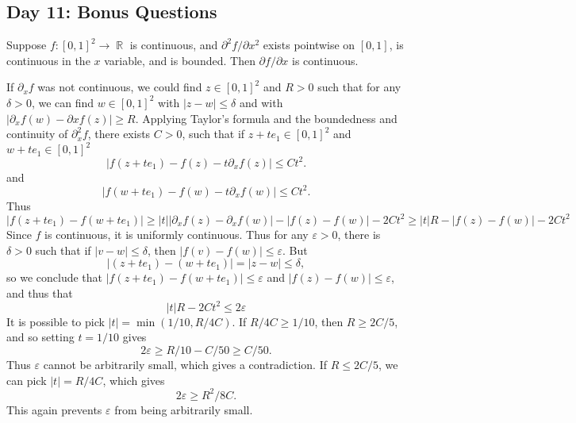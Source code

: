 \documentclass{exam}
\DeclareMathOperator{\RR}{\mathbb{R}}
\theoremstyle{problemstyle}
\newcommand{\1}[1]{\textbf{1}_{\left[#1\right]}} %
\begin{document}
\begin{questions}
\newpage
\section{Day 11: Bonus Questions}

\question Suppose $f: [0,1]^2 \to \RR$ is continuous, and $\partial^2 f / \partial x^2$ exists pointwise on $[0,1]$, is continuous in the $x$ variable, and is bounded. Then $\partial f / \partial x$ is continuous.
\begin{solution}
	If $\partial_x f$ was not continuous, we could find $z \in [0,1]^2$ and $R > 0$ such that for any $\delta > 0$, we can find $w \in [0,1]^2$ with $|z - w| \leq \delta$ and with $| \partial_x f(w) - \partial x f(z)| \geq R$. Applying Taylor's formula and the boundedness and continuity of $\partial_x^2 f$, there exists $C > 0$, such that if $z + te_1 \in [0,1]^2$ and $w + te_1 \in [0,1]^2$
	\[ |f(z + t e_1) - f(z) - t \partial_x f(z)| \leq C t^2. \]
	and
	\[ |f(w + te_1) - f(w) - t \partial_x f(w)| \leq C t^2. \]
	Thus
	\[ |f(z + t e_1) - f(w + te_1)| \geq |t| |\partial_x f(z) - \partial_x f(w)| - |f(z) - f(w)| - 2Ct^2 \geq |t| R - |f(z) - f(w)| - 2Ct^2 \]
	Since $f$ is continuous, it is uniformly continuous. Thus for any $\varepsilon > 0$, there is $\delta > 0$ such that if $|v - w| \leq \delta$, then $|f(v) - f(w)| \leq \varepsilon$. But
	\[ |(z + te_1) - (w + te_1)| = |z - w| \leq \delta, \]
	so we conclude that $|f(z + te_1) - f(w + te_1)| \leq \varepsilon$ and $|f(z) - f(w)| \leq \varepsilon$, and thus that
	\[ |t| R - 2Ct^2 \leq 2 \varepsilon \]
	It is possible to pick $|t| = \min(1/10, R/4C)$. If $R/4C \geq 1/10$, then $R \geq 2C/5$, and so setting $t = 1/10$ gives
	\[ 2 \varepsilon \geq R/10 - C/50 \geq C/50. \]
	Thus $\varepsilon$ cannot be arbitrarily small, which gives a contradiction. If $R \leq 2C/5$, we can pick $|t| = R/4C$, which gives
	\[ 2 \varepsilon \geq R^2/8C. \]
	This again prevents $\varepsilon$ from being arbitrarily small.
\end{solution}


\end{questions}
\end{document}
